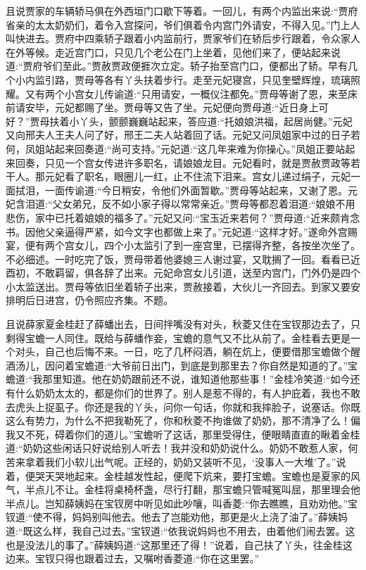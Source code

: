 \begin{parag}
    且说贾家的车辆轿马俱在外西垣门口歇下等着。一回儿，有两个内监出来说:“贾府省亲的太太奶奶们，着令入宫探问，爷们俱着令内宫门外请安，不得入见。”门上人叫快进去。贾府中四乘轿子跟着小内监前行，贾家爷们在轿后步行跟着，令众家人在外等候。走近宫门口，只见几个老公在门上坐着，见他们来了，便站起来说道:“贾府爷们至此。”贾赦贾政便捱次立定。轿子抬至宫门口，便都出了轿。早有几个小内监引路，贾母等各有丫头扶着步行。走至元妃寝宫，只见奎壁辉煌，琉璃照耀。又有两个小宫女儿传谕道:“只用请安，一概仪注都免。”贾母等谢了恩，来至床前请安毕，元妃都赐了坐。贾母等又告了坐。元妃便向贾母道:“近日身上可好？”贾母扶着小丫头，颤颤巍巍站起来，答应道:“托娘娘洪福，起居尚健。”元妃又向邢夫人王夫人问了好，邢王二夫人站着回了话。元妃又问凤姐家中过的日子若何，凤姐站起来回奏道:“尚可支持。”元妃道:“这几年来难为你操心。”凤姐正要站起来回奏，只见一个宫女传进许多职名，请娘娘龙目。元妃看时，就是贾赦贾政等若干人。那元妃看了职名，眼圈儿一红，止不住流下泪来。宫女儿递过绢子，元妃一面拭泪，一面传谕道:“今日稍安，令他们外面暂歇。”贾母等站起来，又谢了恩。元妃含泪道:“父女弟兄，反不如小家子得以常常亲近。”贾母等都忍着泪道:“娘娘不用悲伤，家中已托着娘娘的福多了。”元妃又问:“宝玉近来若何？”贾母道:“近来颇肯念书。因他父亲逼得严紧，如今文字也都做上来了。”元妃道:“这样才好。”遂命外宫赐宴，便有两个宫女儿，四个小太监引了到一座宫里，已摆得齐整，各按坐次坐了。不必细述。一时吃完了饭，贾母带着他婆媳三人谢过宴，又耽搁了一回。看看已近酉初，不敢羁留，俱各辞了出来。元妃命宫女儿引道，送至内宫门，门外仍是四个小太监送出。贾母等依旧坐着轿子出来，贾赦接着，大伙儿一齐回去。到家又要安排明后日进宫，仍令照应齐集。不题。
\end{parag}


\begin{parag}
    且说薛家夏金桂赶了薛蟠出去，日间拌嘴没有对头，秋菱又住在宝钗那边去了，只剩得宝蟾一人同住。既给与薛蟠作妾，宝蟾的意气又不比从前了。金桂看去更是一个对头，自己也后悔不来。一日，吃了几杯闷酒，躺在炕上，便要借那宝蟾做个醒酒汤儿，因问着宝蟾道:“大爷前日出门，到底是到那里去？你自然是知道的了。”宝蟾道:“我那里知道。他在奶奶跟前还不说，谁知道他那些事！”金桂冷笑道:“如今还有什么奶奶太太的，都是你们的世界了。别人是惹不得的，有人护庇着，我也不敢去虎头上捉虱子。你还是我的丫头，问你一句话，你就和我摔脸子，说塞话。你既这么有势力，为什么不把我勒死了，你和秋菱不拘谁做了奶奶，那不清净了么！偏我又不死，碍着你们的道儿。”宝蟾听了这话，那里受得住，便眼睛直直的瞅着金桂道:“奶奶这些闲话只好说给别人听去！我并没和奶奶说什么。奶奶不敢惹人家，何苦来拿着我们小软儿出气呢。正经的，奶奶又装听不见，‘没事人一大堆’了。”说着，便哭天哭地起来。金桂越发性起，便爬下炕来，要打宝蟾。宝蟾也是夏家的风气，半点儿不让。金桂将桌椅杯盏，尽行打翻，那宝蟾只管喊冤叫屈，那里理会他半点儿。岂知薛姨妈在宝钗房中听见如此吵嚷，叫香菱:“你去瞧瞧，且劝劝他。”宝钗道:“使不得，妈妈别叫他去。他去了岂能劝他，那更是火上浇了油了。”薛姨妈道:“既这么样，我自己过去。”宝钗道:“依我说妈妈也不用去，由着他们闹去罢。这也是没法儿的事了。”薛姨妈道:“这那里还了得！”说着，自己扶了丫头，往金桂这边来。宝钗只得也跟着过去，又嘱咐香菱道:“你在这里罢。”
\end{parag}


